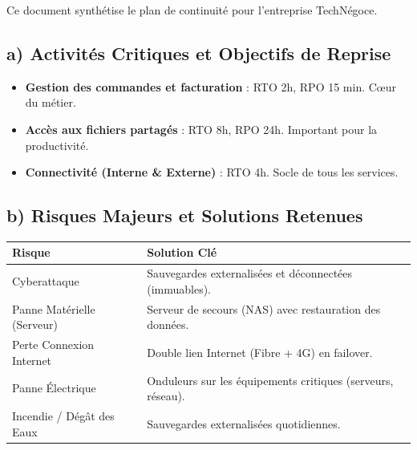 \documentclass[a4paper,10pt]{article}
\newcommand{\notion}[1]{\textbf{\textcolor{mainBlue}{#1}}}
\begin{document}
\begin{tcolorbox}[title=5) Synthèse : Mini Plan de Continuité d'Activité (PCA)]
    Ce document synthétise le plan de continuité pour l'entreprise TechNégoce.

    \subsection*{a) Activités Critiques et Objectifs de Reprise}
    \begin{itemize}[leftmargin=*]
        \item \notion{Gestion des commandes et facturation} : RTO 2h, RPO 15 min. Cœur du métier.
        \item \notion{Accès aux fichiers partagés} : RTO 8h, RPO 24h. Important pour la productivité.
        \item \notion{Connectivité (Interne \& Externe)} : RTO 4h. Socle de tous les services.
    \end{itemize}

    \subsection*{b) Risques Majeurs et Solutions Retenues}
    \begin{tabularx}{\textwidth}{lX}
        \hline
        \rowcolor{bgGray} \bfseries Risque & \bfseries Solution Clé \\ \hline
        Cyberattaque & Sauvegardes externalisées et déconnectées (immuables). \\
        Panne Matérielle (Serveur) & Serveur de secours (NAS) avec restauration des données. \\
        Perte Connexion Internet & Double lien Internet (Fibre + 4G) en failover. \\
        Panne Électrique & Onduleurs sur les équipements critiques (serveurs, réseau). \\
        Incendie / Dégât des Eaux & Sauvegardes externalisées quotidiennes. \\
        \hline
    \end{tabularx}


\end{tcolorbox}
\end{document}
